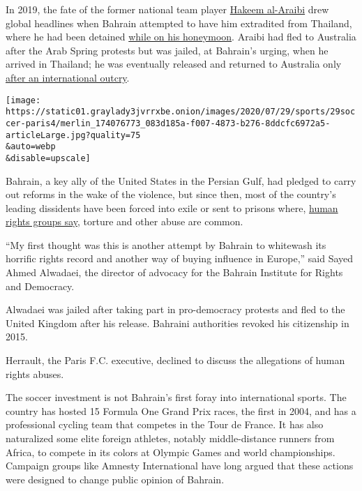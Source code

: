In 2019, the fate of the former national team player
\href{https://www.nytimes3xbfgragh.onion/2019/02/11/world/asia/thailand-soccer-hakeem-al-araibi.html}{Hakeem
al-Araibi} drew global headlines when Bahrain attempted to have him
extradited from Thailand, where he had been detained
\href{https://www.nytimes3xbfgragh.onion/2018/12/06/world/asia/bahrain-thailand-asylum-fifa.html}{while
on his honeymoon}. Araibi had fled to Australia after the Arab Spring
protests but was jailed, at Bahrain's urging, when he arrived in
Thailand; he was eventually released and returned to Australia only
\href{https://www.nytimes3xbfgragh.onion/2018/12/06/world/asia/bahrain-thailand-asylum-fifa.html}{after
an international outcry}.

\texttt{[image: https://static01.graylady3jvrrxbe.onion/images/2020/07/29/sports/29soccer-paris4/merlin\_174076773\_083d185a-f007-4873-b276-8ddcfc6972a5-articleLarge.jpg?quality=75\\\&auto=webp\\\&disable=upscale]}

Bahrain, a key ally of the United States in the Persian Gulf, had
pledged to carry out reforms in the wake of the violence, but since
then, most of the country's leading dissidents have been forced into
exile or sent to prisons where,
\href{http://www.nytimes3xbfgragh.onion/2015/11/23/world/middleeast/abuse-by-bahrain-forces-continues-despite-kings-pledge-rights-group-says.html}{human
rights groups say}, torture and other abuse are common.

``My first thought was this is another attempt by Bahrain to whitewash
its horrific rights record and another way of buying influence in
Europe,'' said Sayed Ahmed Alwadaei, the director of advocacy for the
Bahrain Institute for Rights and Democracy.

Alwadaei was jailed after taking part in pro-democracy protests and fled
to the United Kingdom after his release. Bahraini authorities revoked
his citizenship in 2015.

Herrault, the Paris F.C. executive, declined to discuss the allegations
of human rights abuses.

The soccer investment is not Bahrain's first foray into international
sports. The country has hosted 15 Formula One Grand Prix races, the
first in 2004, and has a professional cycling team that competes in the
Tour de France. It has also naturalized some elite foreign athletes,
notably middle-distance runners from Africa, to compete in its colors at
Olympic Games and world championships. Campaign groups like Amnesty
International have long argued that these actions were designed to
change public opinion of Bahrain.

